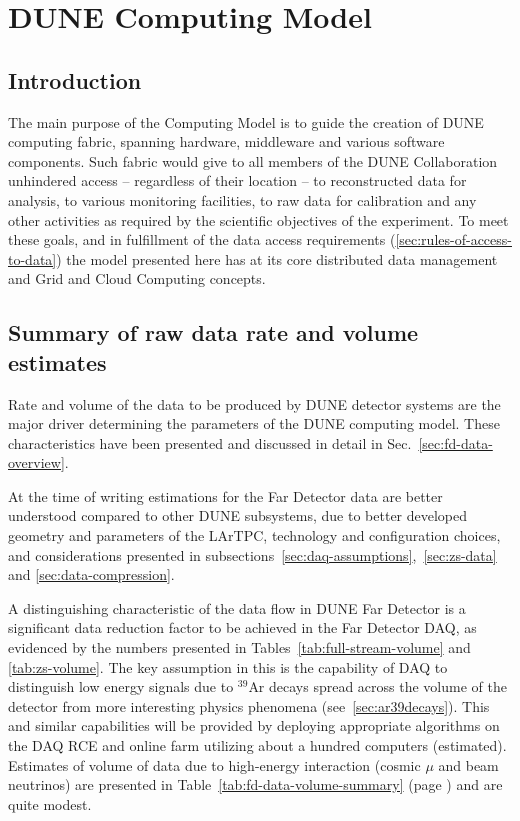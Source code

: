 \section{DUNE Computing Model}
\label{sec:computing_model}

\subsection{Introduction}
The main purpose of the Computing Model is to guide the creation of DUNE computing fabric, spanning
hardware, middleware and various software components. Such fabric would give to all members of the DUNE
Collaboration unhindered access -- regardless of their location -- to reconstructed data for analysis, to various monitoring facilities,
to raw data for calibration and any other activities as required by the scientific objectives of the experiment. To meet these goals,
and in fulfillment of the data access requirements (\ref{sec:rules-of-access-to-data})
the model presented here has at  its core distributed data management and Grid and Cloud Computing concepts.

\subsection{Summary of raw data rate and volume estimates}
Rate and volume of the data to be produced by DUNE detector systems are the major driver determining the parameters
of the DUNE computing model. These characteristics  have been presented and discussed in detail in Sec.~\ref{sec:fd-data-overview}.

At the time of writing estimations for the Far Detector data are better understood compared to other DUNE subsystems,
due to better developed geometry and parameters of the LArTPC, technology and configuration choices, and considerations
presented in subsections~\ref{sec:daq-assumptions},~\ref{sec:zs-data} and \ref{sec:data-compression}.

A distinguishing characteristic of the data flow in DUNE Far Detector is a significant data reduction factor to be achieved
in the Far Detector DAQ, as evidenced by the numbers presented in Tables~\ref{tab:full-stream-volume} and \ref{tab:zs-volume}.
The key assumption in this is the capability of DAQ to distinguish low energy signals  due to $^{39}$Ar decays spread
across the volume of the detector from more interesting physics phenomena (see~\ref{sec:ar39decays}).
This and similar capabilities will be provided
by deploying appropriate algorithms on the DAQ RCE and online farm utilizing about a hundred computers (estimated).
Estimates of volume of data due to high-energy interaction (cosmic $\mu$ and beam neutrinos) are presented in
Table~\ref{tab:fd-data-volume-summary} (page \pageref{tab:fd-data-volume-summary}) and are quite modest.

